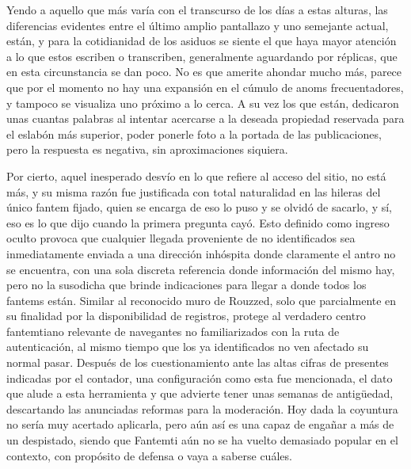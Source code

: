 \documentclass[
]{book}
\begin{document}
Yendo a aquello que más varía con el transcurso de los días a estas alturas, las diferencias evidentes entre el último amplio pantallazo y uno semejante actual, están, y para la cotidianidad de los asiduos se siente el que haya mayor atención a lo que estos escriben o transcriben, generalmente aguardando por réplicas, que en esta circunstancia se dan poco. No es que amerite ahondar mucho más, parece que por el momento no hay una expansión en el cúmulo de anoms frecuentadores, y tampoco se visualiza uno próximo a lo cerca. A su vez los que están, dedicaron unas cuantas palabras al intentar acercarse a la deseada propiedad reservada para el eslabón más superior, poder ponerle foto a la portada de las publicaciones, pero la respuesta es negativa, sin aproximaciones siquiera.

Por cierto, aquel inesperado desvío en lo que refiere al acceso del sitio, no está más, y su misma razón fue justificada con total naturalidad en las hileras del único fantem fijado, quien se encarga de eso lo puso y se olvidó de sacarlo, y sí, eso es lo que dijo cuando la primera pregunta cayó. Esto definido como ingreso oculto provoca que cualquier llegada proveniente de no identificados sea inmediatamente enviada a una dirección inhóspita donde claramente el antro no se encuentra, con una sola discreta referencia donde información del mismo hay, pero no la susodicha que brinde indicaciones para llegar a donde todos los fantems están. Similar al reconocido muro de Rouzzed, solo que parcialmente en su finalidad por la disponibilidad de registros, protege al verdadero centro fantemtiano relevante de navegantes no familiarizados con la ruta de autenticación, al mismo tiempo que los ya identificados no ven afectado su normal pasar. Después de los cuestionamiento ante las altas cifras de presentes indicadas por el contador, una configuración como esta fue mencionada, el dato que alude a esta herramienta y que advierte tener unas semanas de antigüedad, descartando las anunciadas reformas para la moderación. Hoy dada la coyuntura no sería muy acertado aplicarla, pero aún así es una capaz de engañar a más de un despistado, siendo que Fantemti aún no se ha vuelto demasiado popular en el contexto, con propósito de defensa o vaya a saberse cuáles.
\end{document}
